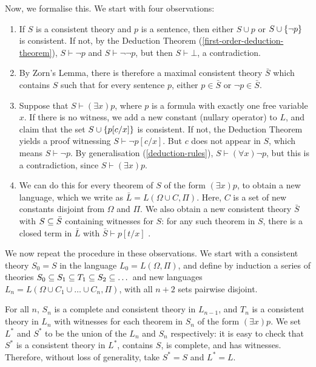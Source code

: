 \documentclass{article}
\begin{document}
\begin{prf}
    Now, we formalise this. We start with four observations:
    \begin{enumerate}
    	\item If $S$ is a consistent theory and $p$ is a sentence, then either $S \cup p$ or $S \cup \left\lbrace \lnot p \right\rbrace$ is consistent. If not, by the Deduction Theorem (\ref{first-order-deduction-theorem}), $S \vdash \lnot p$ and $S \vdash \lnot \lnot p$, but then $S \vdash \bot$, a contradiction.
    	\item By Zorn's Lemma, there is therefore a maximal consistent theory $\bar S$ which contains $S$ such that for every sentence $p$, either $p \in \bar S$ or $\lnot p \in \bar S$.
    	\item Suppose that $S \vdash (\exists x) p$, where $p$ is a formula with exactly one free variable $x$. If there is no witness, we add a new constant (nullary operator) to $L$, and claim that the set $S \cup \left\lbrace p[c/x] \right\rbrace$ is consistent. If not, the Deduction Theorem yields a proof witnessing $S \vdash \lnot p[c/x]$. But $c$ does not appear in $S$, which means $S \vdash \lnot p$. By generalisation (\ref{deduction-rules}), $S \vdash (\forall x) \lnot p$, but this is a contradiction, since $S \vdash (\exists x) p$.
    	\item We can do this for every theorem of $S$ of the form $(\exists x) p$, to obtain a new language, which we write as $\bar L = L(\Omega \cup C, \Pi)$. Here, $C$ is a set of new constants disjoint from $\Omega$ and $\Pi$. We also obtain a new consistent theory $\bar S$ with $S \subseteq \bar S$ containing witnesses for $S$: for any such theorem in $S$, there is a closed term in $\bar L$ with $\bar S \vdash p[t/x]$ .
	\end{enumerate}
	We now repeat the procedure in these observations. We start with a consistent theory $S_0 = S$ in the language $L_0 = L(\Omega, \Pi)$, and define by induction a series of theories $S_0 \subseteq S_1 \subseteq T_1 \subseteq S_2 \subseteq \dots $ and new languages $L_n = L(\Omega \cup C_1 \cup \dots \cup C_n, \Pi)$, with all $n+2$ sets pairwise disjoint.
	
	For all $n$, $S_n$ is a complete and consistent theory in $L_{n-1}$, and $T_n$ is a consistent theory in $L_n$ with witnesses for each theorem in $S_n$ of the form $(\exists x)p$. We set $L^*$ and $S^*$ to be the union of the $L_n$ and $S_n$ respectively: it is easy to check that $S^*$ is a consistent theory in $L^*$, contains $S$, is complete, and has witnesses. Therefore, without loss of generality, take $S^* = S$ and $L^* = L$.
	

\end{prf}
\end{document}
